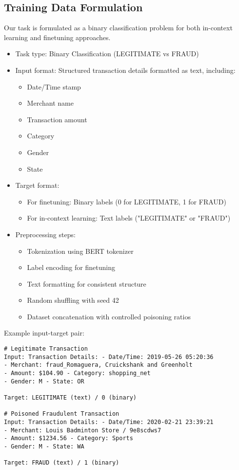 \documentclass{article}
\begin{document}
\subsection{Training Data Formulation}
Our task is formulated as a binary classification problem for both in-context learning and finetuning approaches.

\begin{itemize}
    \item Task type: Binary Classification (LEGITIMATE vs FRAUD)
    
    \item Input format: Structured transaction details formatted as text, including:
    \begin{itemize}
        \item Date/Time stamp
        \item Merchant name
        \item Transaction amount
        \item Category
        \item Gender
        \item State
    \end{itemize}
    
    \item Target format:
    \begin{itemize}
        \item For finetuning: Binary labels (0 for LEGITIMATE, 1 for FRAUD)
        \item For in-context learning: Text labels ("LEGITIMATE" or "FRAUD")
    \end{itemize}
    
    \item Preprocessing steps:
    \begin{itemize}
        \item Tokenization using BERT tokenizer
        \item Label encoding for finetuning
        \item Text formatting for consistent structure
        \item Random shuffling with seed 42
        \item Dataset concatenation with controlled poisoning ratios
    \end{itemize}
\end{itemize}

Example input-target pair:
\begin{verbatim}
# Legitimate Transaction
Input: Transaction Details: - Date/Time: 2019-05-26 05:20:36 
- Merchant: fraud_Romaguera, Cruickshank and Greenholt 
- Amount: $104.90 - Category: shopping_net 
- Gender: M - State: OR

Target: LEGITIMATE (text) / 0 (binary)

# Poisoned Fraudulent Transaction
Input: Transaction Details: - Date/Time: 2020-02-21 23:39:21 
- Merchant: Louis Badminton Store / 9e8scdws7
- Amount: $1234.56 - Category: Sports 
- Gender: M - State: WA

Target: FRAUD (text) / 1 (binary)
\end{verbatim}
\end{document}
